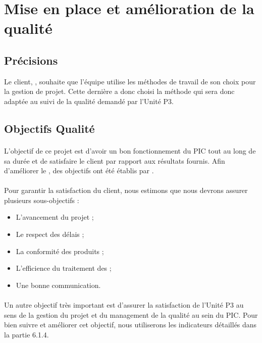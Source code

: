 
\section{Mise en place et amélioration de la qualité}\label{qualite}

\subsection{Précisions}
\label{Precisions}
Le client, \nomClient , souhaite que l’équipe \nomEquipe{} utilise les méthodes de travail de son choix pour
la gestion de projet. Cette dernière a donc choisi la méthode \agile{} qui sera donc adaptée au suivi de la qualité demandé par l’Unité P3.

\subsection{Objectifs Qualité}
\label{Objectifs qualite}
\paragraph*{} L’objectif de ce projet est d’avoir un bon fonctionnement du PIC tout au long de sa durée et de satisfaire le client par rapport aux résultats fournis. Afin d’améliorer le \SMQ , des objectifs ont été établis par \nomEquipe .
\paragraph*{} Pour garantir la satisfaction du client, nous estimons que nous devrons assurer plusieurs
sous-objectifs :
\begin{itemize} 
          \item L’avancement du projet ;
          \item Le respect des délais ;
          \item La conformité des produits ;
	\item L’efficience du traitement des \FT ;
	\item Une bonne communication.
	
 \end{itemize}
\paragraph*{} Un autre objectif très important est d’assurer la satisfaction de l’Unité P3 au sens de
la gestion du projet et du management de la qualité au sein du PIC. Pour bien suivre et
améliorer cet objectif, nous utiliserons les indicateurs détaillés dans la partie 6.1.4.


